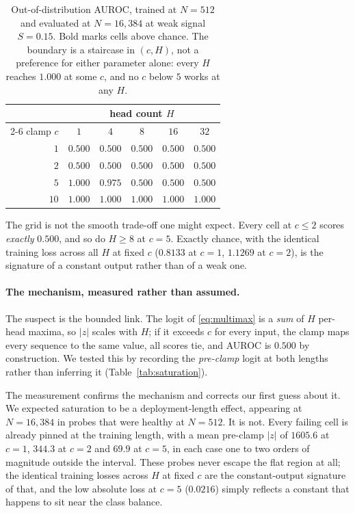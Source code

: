 \documentclass[10pt]{article}
\theoremstyle{plain}
\theoremstyle{definition}
\theoremstyle{remark}
\begin{document}
\begin{table}[!ht]
\centering\small
\begin{tabular}{rccccc}
\toprule
& \multicolumn{5}{c}{head count $H$}\\
\cmidrule(lr){2-6}
clamp $c$ & $1$ & $4$ & $8$ & $16$ & $32$\\
\midrule
$1$  & $0.500$ & $0.500$ & $0.500$ & $0.500$ & $0.500$\\
$2$  & $0.500$ & $0.500$ & $0.500$ & $0.500$ & $0.500$\\
$5$  & $\mathbf{1.000}$ & $\mathbf{0.975}$ & $0.500$ & $0.500$ & $0.500$\\
$10$ & $\mathbf{1.000}$ & $\mathbf{1.000}$ & $\mathbf{1.000}$ & $\mathbf{1.000}$ &
$\mathbf{1.000}$\\
\bottomrule
\end{tabular}
\caption{Out-of-distribution AUROC, trained at $N{=}512$ and evaluated at $N{=}16{,}384$
at weak signal $S{=}0.15$. Bold marks cells above chance. The boundary is a staircase in
$(c,H)$, not a preference for either parameter alone: every $H$ reaches $1.000$ at some
$c$, and no $c$ below $5$ works at any $H$.}
\label{tab:ablation}
\end{table}

The grid is not the smooth trade-off one might expect. Every cell at $c\le2$ scores
\emph{exactly} $0.500$, and so do $H\ge8$ at $c=5$. Exactly chance, with the identical
training loss across all $H$ at fixed $c$ ($0.8133$ at $c{=}1$, $1.1269$ at $c{=}2$), is
the signature of a constant output rather than of a weak one.

\paragraph{The mechanism, measured rather than assumed.} The suspect is the bounded link.
The logit of \eqref{eq:multimax} is a \emph{sum} of $H$ per-head maxima, so $|z|$ scales
with $H$; if it exceeds $c$ for every input, the clamp maps every sequence to the same
value, all scores tie, and AUROC is $0.500$ by construction. We tested this by recording
the \emph{pre-clamp} logit at both lengths rather than inferring it
(Table~\ref{tab:saturation}).

The measurement confirms the mechanism and corrects our first guess about it. We expected
saturation to be a deployment-length effect, appearing at $N{=}16{,}384$ in probes that
were healthy at $N{=}512$. It is not. Every failing cell is already pinned at the training
length, with a mean pre-clamp $|z|$ of $1605.6$ at $c{=}1$, $344.3$ at $c{=}2$ and $69.9$
at $c{=}5$, in each case one to two orders of magnitude outside the interval. These probes
never escape the flat region at all; the identical training losses across $H$ at fixed $c$
are the constant-output signature of that, and the low absolute loss at $c{=}5$ ($0.0216$)
simply reflects a constant that happens to sit near the class balance.
\end{document}
